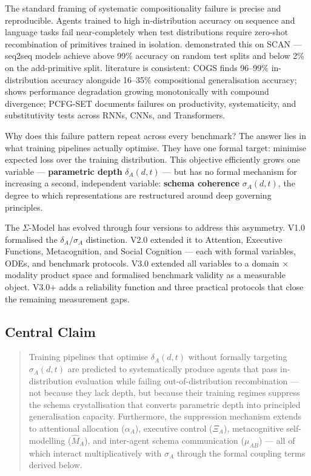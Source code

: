 \documentclass[10pt]{article}
\begin{document}
The standard framing of systematic compositionality failure is precise
and reproducible. Agents trained to high in-distribution accuracy on
sequence and language tasks fail near-completely when test distributions
require zero-shot recombination of primitives trained in isolation.
\cite{lake2018generalizationwithoutsystematicity} demonstrated this on
SCAN --- seq2seq models achieve above 99\% accuracy on random test splits
and below 2\% on the add-primitive split. %
literature is consistent: COGS \citep{kim2020cogscompositionalgeneralizationchallenge}
finds 96--99\% in-distribution accuracy alongside 16--35\% compositional
generalisation accuracy; %
shows performance degradation growing monotonically with compound
divergence; PCFG-SET \citep{hupkes2020compositionalitydecomposed} documents
failures on productivity, systematicity, and substitutivity tests across
RNNs, CNNs, and Transformers.

Why does this failure pattern repeat across every benchmark? The answer
lies in what training pipelines actually optimise. They have one formal
target: minimise expected loss over the training distribution. This
objective efficiently grows one variable --- \textbf{parametric depth}
$\delta_A(d,t)$ --- but has no formal mechanism for increasing a
second, independent variable: \textbf{schema coherence} $\sigma_A(d,t)$,
the degree to which representations are restructured around deep
governing principles.

The $\Sigma$-Model has evolved through four versions to address this
asymmetry. V1.0 formalised the $\delta_A$/$\sigma_A$ distinction. V2.0
extended it to Attention, Executive Functions, Metacognition, and Social
Cognition --- each with formal variables, ODEs, and benchmark protocols.
V3.0 extended all variables to a domain $\times$ modality product space
and formalised benchmark validity as a measurable object. V3.0$+$ adds a
reliability function and three practical protocols that close the remaining
measurement gaps.

\subsection{Central Claim}\label{sec:central-claim}

\begin{quote}
Training pipelines that optimise $\delta_A(d,t)$ without formally
targeting $\sigma_A(d,t)$ are predicted to systematically produce
agents that pass in-distribution evaluation while failing
out-of-distribution recombination --- not because they lack depth,
but because their training regimes suppress the schema crystallisation
that converts parametric depth into principled generalisation capacity.
Furthermore, the suppression mechanism extends to attentional allocation
($\alpha_A$), executive control ($\Xi_A$), metacognitive self-modelling
($\hat{M}_A$), and inter-agent schema communication ($\mu_{AB}$) ---
all of which interact multiplicatively with $\sigma_A$ through the
formal coupling terms derived below.
\end{quote}
\end{document}

